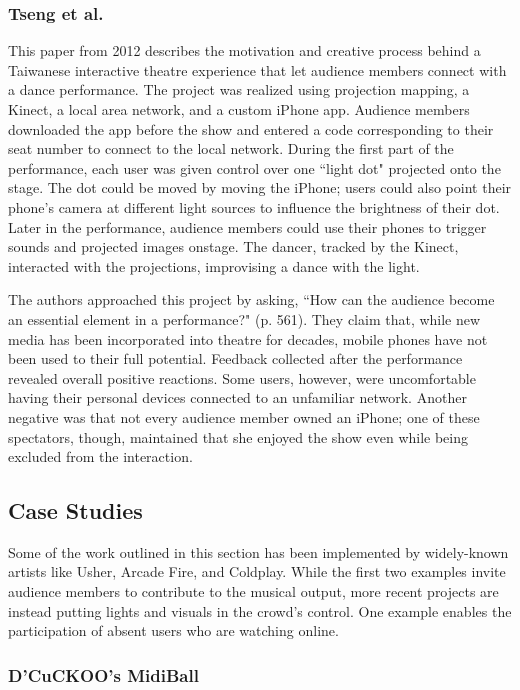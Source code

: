 \subsubsection{Tseng et al.}

This paper from 2012 describes the motivation and creative process behind a Taiwanese interactive theatre experience that let audience members connect with a dance performance. The project was realized using projection mapping, a Kinect, a local area network, and a custom iPhone app. Audience members downloaded the app before the show and entered a code corresponding to their seat number to connect to the local network. During the first part of the performance, each user was given control over one ``light dot" projected onto the stage. The dot could be moved by moving the iPhone; users could also point their phone's camera at different light sources to influence the brightness of their dot. Later in the performance, audience members could use their phones to trigger sounds and projected images onstage. The dancer, tracked by the Kinect, interacted with the projections, improvising a dance with the light.

The authors approached this project by asking, ``How can the audience become an essential element in a performance?" (p. 561). They claim that, while new media has been incorporated into theatre for decades, mobile phones have not been used to their full potential. Feedback collected after the performance revealed overall positive reactions. Some users, however, were uncomfortable having their personal devices connected to an unfamiliar network. Another negative was that not every audience member owned an iPhone; one of these spectators, though, maintained that she enjoyed the show even while being excluded from the interaction.

\subsection{Case Studies}

Some of the work outlined in this section has been implemented by widely-known artists like Usher, Arcade Fire, and Coldplay. While the first two examples invite audience members to contribute to the musical output, more recent projects are instead putting lights and visuals in the crowd's control. One example enables the participation of absent users who are watching online.

\subsubsection{D'CuCKOO's MidiBall}

